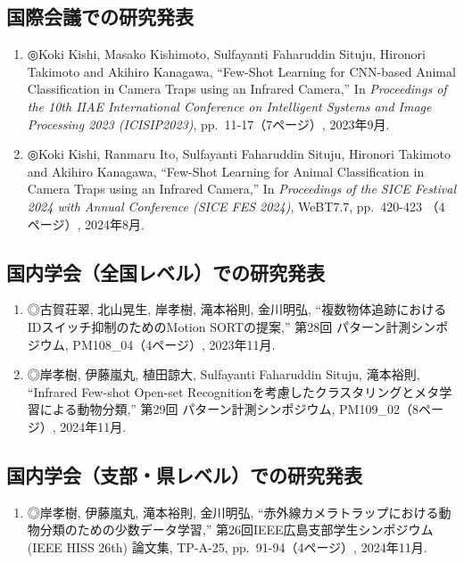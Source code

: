 \documentclass[a4paper,11pt,nomag]{jsreport}
\begin{document}
\subsection*{国際会議での研究発表}
\begin{enumerate}
  \item ◎Koki Kishi, Masako Kishimoto, Sulfayanti Faharuddin Situju, Hironori Takimoto and Akihiro Kanagawa, ``Few-Shot Learning for CNN-based Animal Classification in Camera Traps using an Infrared Camera,'' In \textit{Proceedings of the 10th IIAE International Conference on Intelligent Systems and Image Processing 2023 (ICISIP2023)}, pp.~11-17（7ページ）, 2023年9月.
  \item ◎Koki Kishi, Ranmaru Ito, Sulfayanti Faharuddin Situju, Hironori Takimoto and Akihiro Kanagawa, ``Few-Shot Learning for Animal Classification in Camera Traps using an Infrared Camera,'' In \textit{Proceedings of the SICE Festival 2024 with Annual Conference (SICE FES 2024)}, WeBT7.7, pp.~420-423 （4ページ）, 2024年8月.
\end{enumerate}

\subsection*{国内学会（全国レベル）での研究発表}
\begin{enumerate}
  \item ◎古賀荘翠, 北山晃生, 岸孝樹, 滝本裕則, 金川明弘, ``複数物体追跡におけるIDスイッチ抑制のためのMotion SORTの提案,'' 第28回 パターン計測シンポジウム, PM108\_04（4ページ）, 2023年11月.
  \item ◎岸孝樹, 伊藤嵐丸, 植田諒大, Sulfayanti Faharuddin Situju, 滝本裕則, ``Infrared Few-shot Open-set Recognitionを考慮したクラスタリングとメタ学習による動物分類,'' 第29回 パターン計測シンポジウム, PM109\_02（8ページ）, 2024年11月.
\end{enumerate}

\subsection*{国内学会（支部・県レベル）での研究発表}
\begin{enumerate}
  \item ◎岸孝樹, 伊藤嵐丸, 滝本裕則, 金川明弘, ``赤外線カメラトラップにおける動物分類のための少数データ学習,'' 第26回IEEE広島支部学生シンポジウム (IEEE HISS 26th) 論文集, TP-A-25, pp.~91-94（4ページ）, 2024年11月.
\end{enumerate}
\end{document}
